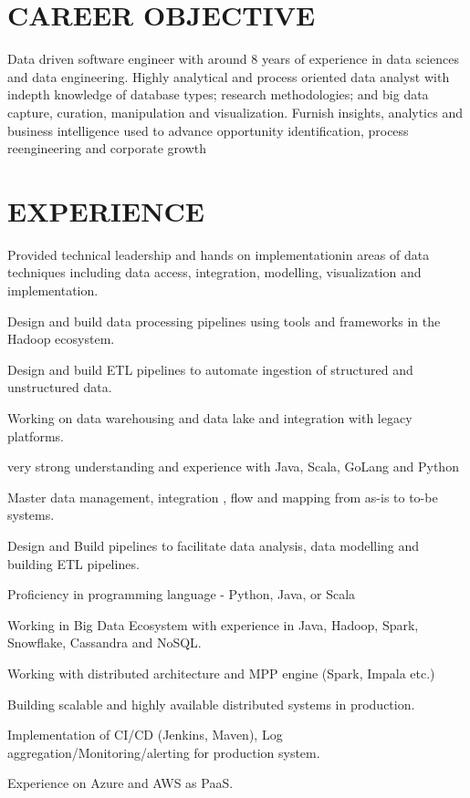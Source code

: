 \documentclass[]{deedy-resume-openfont}
\begin{document}
\begin{minipage}[t]{0.60\textwidth} 

\section{CAREER OBJECTIVE}
Data driven software engineer with around 8 years of experience in data sciences and data engineering. Highly analytical and process oriented data analyst with indepth knowledge of database types; research methodologies; and big data capture, curation,
manipulation and visualization.
Furnish insights, analytics and
business intelligence used to
advance opportunity
identification, process
reengineering and corporate
growth

\section{EXPERIENCE}
\sectionsep

\hspace{\topsep} %
\begin{tightemize}
\item Provided technical leadership and hands on implementationin areas of data techniques including data access, integration, modelling, visualization and implementation.
\item Design and build data processing pipelines using tools and
frameworks in the Hadoop ecosystem.
\item Design and build ETL pipelines to automate ingestion of
structured and unstructured data.
\item Working on data warehousing and data lake and integration
with legacy platforms.
\item very strong understanding and experience with Java, Scala, GoLang and Python
\item Master data management, integration , flow and mapping from
as-is to to-be systems.
\item Design and Build pipelines to facilitate data analysis, data
modelling and building ETL pipelines.
\item Proficiency in programming language - Python, Java, or Scala
\item Working in Big Data Ecosystem with experience in Java,
Hadoop, Spark, Snowflake, Cassandra and NoSQL.
\item Working with distributed architecture and MPP engine (Spark,
Impala etc.)
\item Building scalable and highly available distributed systems in production.
\item Implementation of CI/CD (Jenkins, Maven), Log aggregation/Monitoring/alerting for production
system.
\item Experience on Azure and AWS as PaaS.
\end{tightemize}


\end{minipage}
\end{document}
